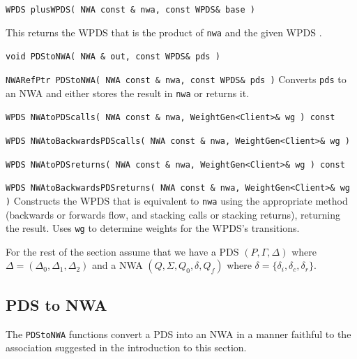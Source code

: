 \begin{description}

  \item\texttt{WPDS plusWPDS( NWA const \& nwa, const WPDS\& base )} \nopagebreak

    This returns the WPDS that is the
    product of \texttt{nwa} and the given WPDS
    \cite{advancedquerying}.

  \item\texttt{void PDStoNWA( NWA \& out, const WPDS\& pds )} \nopagebreak
  \item\texttt{NWARefPtr PDStoNWA( NWA const \& nwa, const WPDS\& pds )} \nopagebreak
    Converts \texttt{pds} to an NWA and either stores the result in
    \texttt{nwa} or returns it.


  \item\texttt{WPDS NWAtoPDScalls( NWA const \& nwa, WeightGen<Client>\& wg ) const} \nopagebreak
  \item\texttt{WPDS NWAtoBackwardsPDScalls( NWA const \& nwa, WeightGen<Client>\& wg )} \nopagebreak
  \item\texttt{WPDS NWAtoPDSreturns( NWA const \& nwa, WeightGen<Client>\& wg ) const} \nopagebreak
  \item\texttt{WPDS NWAtoBackwardsPDSreturns( NWA const \& nwa, WeightGen<Client>\& wg )} \nopagebreak
    Constructs the WPDS that is equivalent to \texttt{nwa} using the
    appropriate method (backwards or forwards flow, and stacking calls or
    stacking returns), returning the result. Uses \texttt{wg} to determine
    weights for the WPDS's transitions.
\end{description}

\begin{changebar}
For the rest of the section assume that we have a PDS $(P, \Gamma, \Delta )$ 
where $\Delta = (\Delta_0, \Delta_1, \Delta_2)$ and a 
NWA $(Q, \Sigma,
Q_0, \delta, Q_f)$ where $\delta =
\{\delta_i,\delta_c,\delta_r\}$.

\end{changebar}

\subsection{PDS to NWA}
\label{Se:PDStoNWA}

The \texttt{PDStoNWA} functions convert a PDS into an NWA in a manner
faithful to the association suggested in the introduction to this section.

